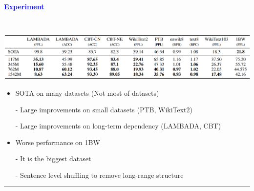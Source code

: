 \documentclass[professionalfont]{beamer}
\begin{document}
\begin{frame}
\begin{refsection}

\begin{center}
    { \textbf{\textcolor{blue}{ {\fontsize{12}{14}\selectfont Experiment} }} }
\end{center}
\\[0.3cm]
\begin{center}
    \includegraphics[width=1.0\textwidth]{table3.png}
\end{center}

{\fontsize{10}{14}\selectfont 
\begin{itemize}
    \item SOTA on many datasets (Not most of datasets)
    
    - Large improvements on small datasets (PTB, WikiText2)

    - Large improvements on long-term dependency (LAMBADA, CBT)

    \item Worse performance on 1BW \cite{1BW}
    
    - It is the biggest dataset

    - Sentence level shuffling to remove long-range structure

\end{itemize}
}

\vspace{0.3cm}
\hrule
\printbibliography 

\end{refsection}
\end{frame}
\end{document}
